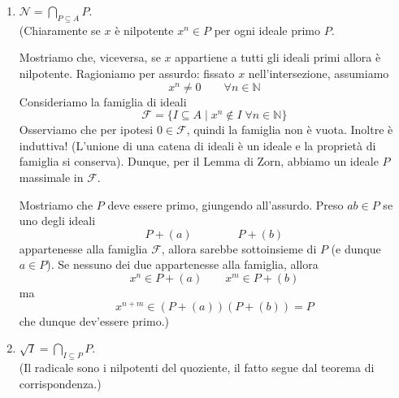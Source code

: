 \documentclass[a4paper]{article}
\theoremstyle{remark}
\theoremstyle{definition}
\begin{document}
\begin{multicols}{2}
\begin{enumerate}
	\item $ \mathcal{N} = \bigcap_{P \subseteq A} P $. \\ (Chiaramente se $ x $ è nilpotente $ x ^n \in P $ per ogni ideale primo $ P $.
	
	Mostriamo che, viceversa, se $ x $ appartiene a tutti gli ideali primi allora è nilpotente. Ragioniamo per assurdo: fissato $ x $ nell'intersezione, assumiamo $$  x^n \neq 0 \qquad \forall n \in \mathbb{N} $$ Consideriamo la famiglia di ideali
	$$  \mathcal{F} = \{ I \subseteq A \mid x^n \notin I \;\forall n \in \mathbb{N}  \}  $$
	Osserviamo che per ipotesi $ {0} \in \mathcal{F} $, quindi la famiglia non è vuota. Inoltre è induttiva! (L'unione di una catena di ideali è un ideale e la proprietà di famiglia si conserva). Dunque, per il Lemma di Zorn, abbiamo un ideale $ P $ massimale in $ \mathcal F $.
	
	Mostriamo che $ P $ deve essere primo, giungendo all'assurdo. Preso $ ab \in P $ se uno degli ideali 
	\[ P + (a) \qquad \qquad P + (b) \]
	appartenesse alla famiglia $ \mathcal{F} $, allora sarebbe sottoinsieme di $ P $ (e dunque $ a \in P $). Se nessuno dei due appartenesse alla famiglia, allora
	\[ x^n \in P + (a) \qquad x^m \in P + (b) \]
	ma
	\[ x^{n + m} \in (P + (a))(P + (b)) = P \]
	che dunque dev'essere primo.)
	
	\item $ \sqrt{I} = \bigcap_{I \subseteq P} P $. \\ (Il radicale sono i nilpotenti del quoziente, il fatto segue dal teorema di corrispondenza.)
	
\end{enumerate}

\end{multicols}
\end{document}

